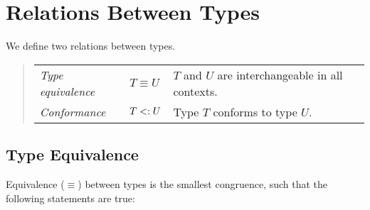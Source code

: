 \section{Relations Between Types}

We define two relations between types. 
\begin{quote}\begin{tabular}{l@{\gap}l@{\gap}l}
\em Type equivalence & $T \equiv U$ & $T$ and $U$ are interchangeable
in all contexts.
\\
\em Conformance & $T <: U$ & Type $T$ conforms to type $U$.
\end{tabular}\end{quote}

\subsection{Type Equivalence}

Equivalence ($\equiv$) between types is the smallest congruence, such that the following statements are true:

